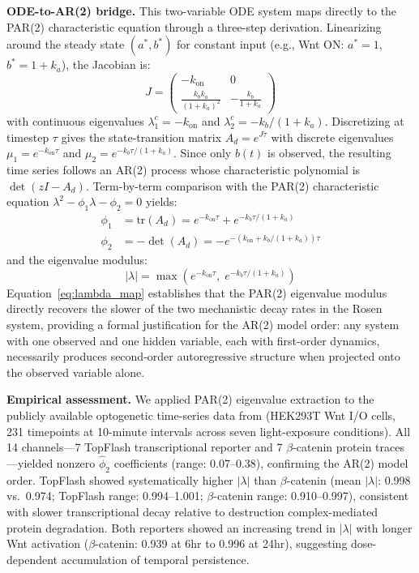 \documentclass[11pt,letterpaper]{article}
\begin{document}
\textbf{ODE-to-AR(2) bridge.} This two-variable ODE system maps directly to the PAR(2) characteristic equation through a three-step derivation. Linearizing around the steady state $(a^*, b^*)$ for constant input (e.g., Wnt ON: $a^* = 1$, $b^* = 1 + k_a$), the Jacobian is:
\begin{equation}
J = \begin{pmatrix} -k_{\text{on}} & 0 \\ \frac{k_b k_a}{(1+k_a)^2} & -\frac{k_b}{1+k_a} \end{pmatrix}
\label{eq:jacobian}
\end{equation}
with continuous eigenvalues $\lambda_1^c = -k_{\text{on}}$ and $\lambda_2^c = -k_b/(1+k_a)$. Discretizing at timestep $\tau$ gives the state-transition matrix $A_d = e^{J\tau}$ with discrete eigenvalues $\mu_1 = e^{-k_{\text{on}}\tau}$ and $\mu_2 = e^{-k_b\tau/(1+k_a)}$. Since only $b(t)$ is observed, the resulting time series follows an AR(2) process whose characteristic polynomial is $\det(zI - A_d)$. Term-by-term comparison with the PAR(2) characteristic equation $\lambda^2 - \phi_1\lambda - \phi_2 = 0$ yields:
\begin{align}
\phi_1 &= \text{tr}(A_d) = e^{-k_{\text{on}}\tau} + e^{-k_b\tau/(1+k_a)} \label{eq:phi1_map} \\
\phi_2 &= -\det(A_d) = -e^{-(k_{\text{on}} + k_b/(1+k_a))\tau} \label{eq:phi2_map}
\end{align}
and the eigenvalue modulus:
\begin{equation}
|\lambda| = \max\left(e^{-k_{\text{on}}\tau},\; e^{-k_b\tau/(1+k_a)}\right)
\label{eq:lambda_map}
\end{equation}
Equation~\ref{eq:lambda_map} establishes that the PAR(2) eigenvalue modulus directly recovers the slower of the two mechanistic decay rates in the Rosen system, providing a formal justification for the AR(2) model order: any system with one observed and one hidden variable, each with first-order dynamics, necessarily produces second-order autoregressive structure when projected onto the observed variable alone.

\textbf{Empirical assessment.} We applied PAR(2) eigenvalue extraction to the publicly available optogenetic time-series data from \citet{rosen2026} (HEK293T Wnt I/O cells, 231 timepoints at 10-minute intervals across seven light-exposure conditions). All 14 channels---7 TopFlash transcriptional reporter and 7 $\beta$-catenin protein traces---yielded nonzero $\hat{\phi}_2$ coefficients (range: 0.07--0.38), confirming the AR(2) model order. TopFlash showed systematically higher $|\lambda|$ than $\beta$-catenin (mean $|\lambda|$: 0.998 vs.\ 0.974; TopFlash range: 0.994--1.001; $\beta$-catenin range: 0.910--0.997), consistent with slower transcriptional decay relative to destruction complex-mediated protein degradation. Both reporters showed an increasing trend in $|\lambda|$ with longer Wnt activation ($\beta$-catenin: 0.939 at 6hr to 0.996 at 24hr), suggesting dose-dependent accumulation of temporal persistence.
\end{document}
